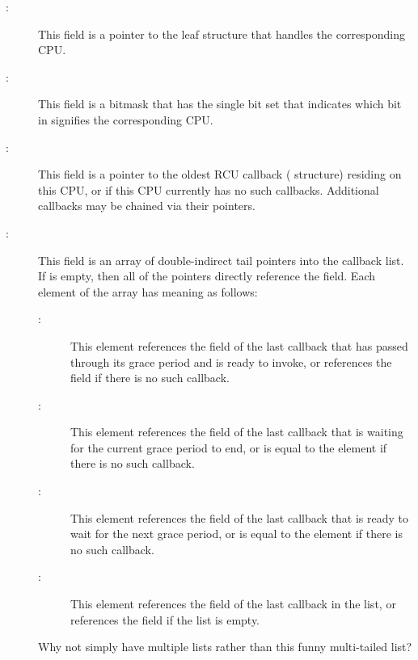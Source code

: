\begin{description}
\item[:]
	This field is a pointer to the leaf  structure that
	handles the corresponding CPU.
\item[:]
	This field is a bitmask that has the single bit set that indicates
	which bit in  signifies the corresponding CPU.
\item[:]
	This field is a pointer to the oldest RCU callback (
	structure) residing on this CPU, or  if this CPU currently
	has no such callbacks.
	Additional callbacks may be chained via their  pointers.
\item[:]
	This field is an array of double-indirect tail pointers
	into the  callback list.
	If  is empty, then all of the  pointers
	directly reference the  field.
	Each element of the  array has meaning as follows:
	\begin{description}
	\item[:]
		This element references the  field of
		the last callback that has passed through its grace
		period and is ready to invoke, or references the 
		field if there is no such callback.
	\item[:]
		This element references the  field of the
		last callback that is waiting for the current grace
		period to end, or is equal to the 
		element if there is no such callback.
	\item[:]
		This element references the  field of the
		last callback that is ready to wait for the next
		grace period, or is equal to the 
		element if there is no such callback.
	\item[:]
		This element references the  field of the
		last callback in the list, or references the 
		field if the list is empty.
	\end{description}

\QuickQuiz{}
	Why not simply have multiple lists rather than this funny
	multi-tailed list?
 \QuickQuizEnd


\end{description}
